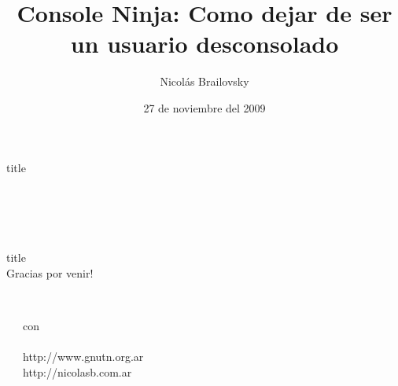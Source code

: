 \documentclass{beamer}
\institute[UTN]{Universidad Tecnol\'ogica Nacional}
\date[] {27 de noviembre del 2009}
\title[Console Foo]{Console Ninja: Como dejar de ser un usuario desconsolado}
\subtitle{}
\author[]{Nicol\'as Brailovsky}
\begin{document}
\begin{frame}[plain]
	\begin{center}  \end{center}

	\begin{beamercolorbox}[sep=.01cm,shadow=true,rounded=true,center]{title}
		\inserttitle
	\end{beamercolorbox}

	\begin{columns}[onlytextwidth]
		\begin{center}
		\end{center}
		\begin{center} {\color{black} 
			\insertinstitute \\
			\insertauthor \\
			\rule{0em}{8pt}
			\insertdate
		}  \end{center}
	\end{columns}

\end{frame}

\begin{frame}
  \tableofcontents[hideallsubsections]
\end{frame}









\begin{frame}[plain]{}
\begin{beamercolorbox}[rounded=true,center]{title}
	\inserttitle  \\
	Gracias por venir!
\end{beamercolorbox}
\begin{columns}[onlytextwidth]
	\begin{center}
	\end{center}
	\begin{center}
		\insertauthor \\ con \\
		 \\
		http://www.gnutn.org.ar \\
		http://nicolasb.com.ar
	\end{center}
\end{columns}
\end{frame}
\end{document}
